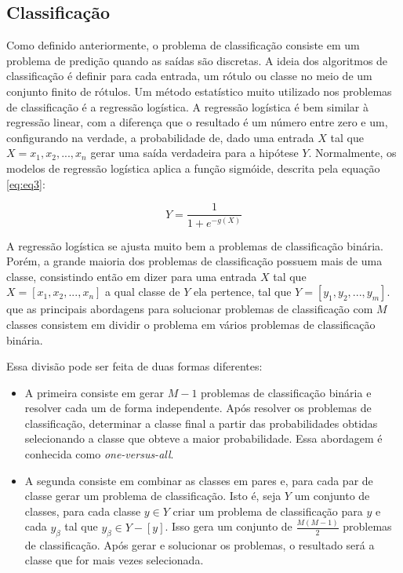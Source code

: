 \subsection{Classificação}
\label{subsecao:2:1:2}

Como definido anteriormente, o problema de classificação consiste em um problema de predição quando as saídas são discretas. A ideia dos algoritmos de classificação é definir para cada entrada, um rótulo ou classe no meio de um conjunto finito de rótulos. Um método estatístico muito utilizado nos problemas de classificação é a regressão logística. A regressão logística é bem similar à regressão linear, com a diferença que o resultado é um número entre zero e um, configurando na verdade, a probabilidade de, dado uma entrada $X$ tal que $X = {x_1, x_2, ..., x_n}$ gerar uma saída verdadeira para a hipótese $Y$. Normalmente, os modelos de regressão logística aplica a função sigmóide, descrita pela equação \ref{eq:eq3}:

\begin{equation}
\label{eq:eq3}
Y = \dfrac{1}{1 + e^{-g(X)}}
\end{equation}

A regressão logística se ajusta muito bem a problemas de classificação binária. Porém, a grande maioria dos problemas de classificação possuem mais de uma classe, consistindo então em dizer para uma entrada $X$ tal que $X = [x_1, x_2, ..., x_n]$ a qual classe de $Y$ ela pertence, tal que $Y = [y_1, y_2, ..., y_m]$.  que as principais abordagens para solucionar problemas de classificação com $M$ classes consistem em dividir o problema em vários problemas de classificação binária.

Essa divisão pode ser feita de duas formas diferentes: 
\begin{itemize}
	\item A primeira consiste em gerar $M - 1$ problemas de classificação binária e resolver cada um de forma independente. Após resolver os problemas de classificação, determinar a classe final a partir das probabilidades obtidas selecionando a classe que obteve a maior probabilidade. Essa abordagem é conhecida como \textit{one-versus-all}.
	\item A segunda consiste em combinar as classes em pares e, para cada par de classe gerar um problema de classificação. Isto é, seja $Y$ um conjunto de classes, para cada classe $y \in Y$ criar um problema de classificação para $y$ e  cada $y_\beta$ tal que $y_\beta \in Y - [y]$. Isso gera um conjunto de $\frac{M (M - 1)}{2}$ problemas de classificação. Após gerar e solucionar os problemas, o resultado será a classe que for mais vezes selecionada.
\end{itemize}

